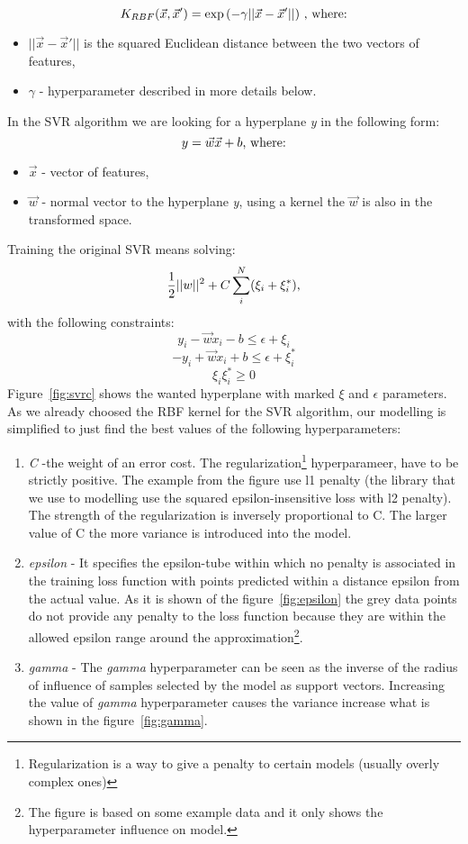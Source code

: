 \[ K_{RBF}(\vec{x}, \vec{x}') = \exp{(-\gamma||\vec{x} - \vec{x}'||)}\ \textnormal{, where:}\]
\begin{itemize}
	\item $ ||\vec{x} - \vec{x}'|| $ is the squared Euclidean distance between the two vectors of features,\newline
	\item $ \gamma $ - hyperparameter described in more details below.
\end{itemize}
In the SVR algorithm we are looking for a hyperplane \textit{y} in the following form:
\[ y = \vec{w} \vec{x} + b \textnormal{, where:}\]
\begin{itemize}
	\item $ \vec{x} $ - vector of features,
	\item $ \vec{w} $ - normal vector to the hyperplane \textit{y}, using a kernel the $ \vec{w} $ is also in the transformed space.
\end{itemize}
Training the original SVR means solving:
\[ \frac{1}{2}||w||^2  + C \sum_{i}^{N}(\xi_i+\xi_i^*) \textnormal{,}\]
with the following constraints:
\[ y_i - \vec{w}x_i - b \le \epsilon + \xi_i  \]
\[ -y_i + \vec{w}x_i + b \le \epsilon + \xi_i^*  \]
\[ \xi_i \xi_i^* \ge 0 \]
Figure~\ref{fig:svrc} shows the wanted hyperplane with marked \textit{$\xi$} and \textit{$\epsilon$} parameters.
As we already choosed the RBF kernel for the SVR algorithm, our modelling is simplified to just find the best values of the following hyperparameters\cite{svr}:
\begin{enumerate}
	\item \textit{C} -the weight of an error cost. The regularization\footnote{Regularization is a way to give a penalty to certain models (usually overly complex ones)} hyperparameer, have to be strictly positive. The example from the figure use l1 penalty (the library that we use to modelling use the squared epsilon-insensitive loss with l2 penalty). The strength of the regularization is inversely proportional to C. The larger value of C the more variance is introduced into the model. 
	\item \textit{epsilon} - It specifies the epsilon-tube within which no penalty is associated in the training loss function with points predicted within a distance epsilon from the actual value. As it is shown of the figure~\ref{fig:epsilon} the grey data points do not provide any penalty to the loss function because they are within the allowed epsilon range around the approximation\footnote{\label{figure_example}The figure is based on some example data and it only shows the hyperparameter influence on model.}.
	\item \textit{gamma} - The \textit{gamma} hyperparameter can be seen as the inverse of the radius of influence of samples selected by the model as support vectors. Increasing the value of \textit{gamma} hyperparameter causes the variance increase what is shown in the figure~\ref{fig:gamma}.
	
\end{enumerate}
